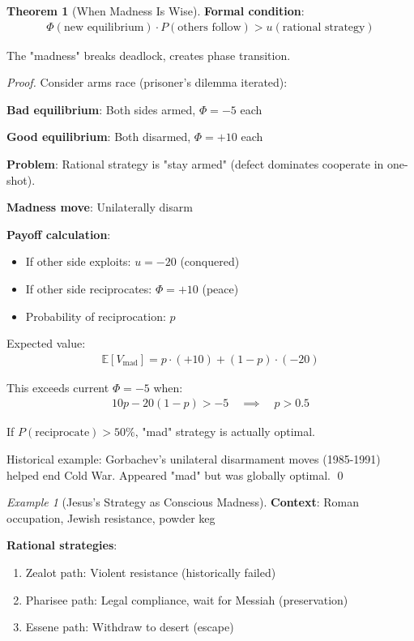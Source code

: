 \documentclass[11pt,a4paper]{article}
\theoremstyle{definition}
\newtheorem{theorem}{Theorem}[section]
\theoremstyle{remark}
\newtheorem{example}{Example}[section]
\begin{document}
\begin{enumerate}
\begin{theorem}[When Madness Is Wise]
\textbf{Formal condition}:
\begin{align}
\Phi(\text{new equilibrium}) \cdot P(\text{others follow}) > u(\text{rational strategy})
\end{align}

The "madness" breaks deadlock, creates phase transition.
\end{theorem}

\begin{proof}
Consider arms race (prisoner's dilemma iterated):

\textbf{Bad equilibrium}: Both sides armed, \(\Phi = -5\) each

\textbf{Good equilibrium}: Both disarmed, \(\Phi = +10\) each

\textbf{Problem}: Rational strategy is "stay armed" (defect dominates cooperate in one-shot).

\textbf{Madness move}: Unilaterally disarm

\textbf{Payoff calculation}:
\begin{itemize}
    \item If other side exploits: \(u = -20\) (conquered)
    \item If other side reciprocates: \(\Phi = +10\) (peace)
    \item Probability of reciprocation: \(p\)
\end{itemize}

Expected value:
\begin{align}
\mathbb{E}[V_{\text{mad}}] = p \cdot (+10) + (1-p) \cdot (-20)
\end{align}

This exceeds current \(\Phi = -5\) when:
\begin{align}
10p - 20(1-p) > -5 \quad \implies \quad p > 0.5
\end{align}

If \(P(\text{reciprocate}) > 50\%\), "mad" strategy is actually optimal.

Historical example: Gorbachev's unilateral disarmament moves (1985-1991) helped end Cold War. Appeared "mad" but was globally optimal. \qed
\end{proof}

\begin{example}[Jesus's Strategy as Conscious Madness]
\textbf{Context}: Roman occupation, Jewish resistance, powder keg

\textbf{Rational strategies}:
\begin{enumerate}
    \item Zealot path: Violent resistance (historically failed)
    \item Pharisee path: Legal compliance, wait for Messiah (preservation)
    \item Essene path: Withdraw to desert (escape)
\end{enumerate}


\end{example}
\end{enumerate}
\end{document}
